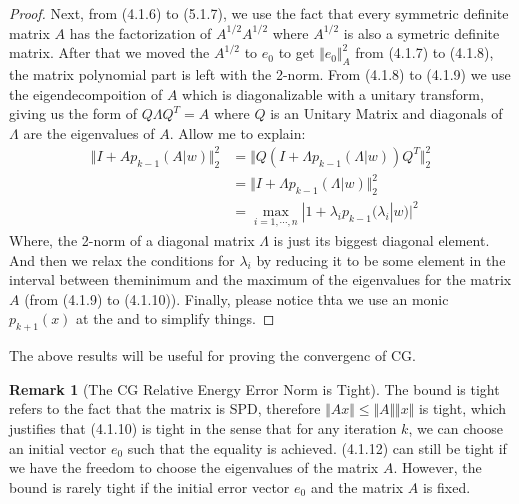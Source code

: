 \documentclass[]{article}
\theoremstyle{definition}
\newtheorem{remark}{Remark}[subsection]
\begin{document}
\begin{proof}
            \par
            Next, from (4.1.6) to (5.1.7), we use the fact that every symmetric definite matrix $A$ has the factorization of $A^{1/2}A^{1/2}$ where $A^{1/2}$ is also a symetric definite matrix. After that we moved the $A^{1/2}$ to $e_0$ to get $\Vert e_0\Vert_A^2$ from (4.1.7) to (4.1.8), the matrix polynomial part is left with the 2-norm. From (4.1.8) to (4.1.9) we use the eigendecompoition of $A$ which is diagonalizable with a unitary transform, giving us the form of $Q\Lambda Q^T = A$ where $Q$ is an Unitary Matrix and diagonals of $\Lambda$ are the eigenvalues of $A$. Allow me to explain: 
            \begin{align}
                \Vert I + Ap_{k - 1}(A|w)\Vert_2^2
                &= \Vert Q(I + \Lambda p_{k - 1}(\Lambda|w))Q^T\Vert_2^2
                \\
                &= \Vert I + \Lambda p_{k - 1}(\Lambda|w)\Vert_2^2
                \\
                &= \max_{i=1,\cdots, n}|1 + \lambda_ip_{k - 1}(\lambda_i|w)|^2
            \end{align}
            Where, the 2-norm of a diagonal matrix $\Lambda$ is just its biggest diagonal element. And then we relax the conditions for $\lambda_i$ by reducing it to be some element in the interval between theminimum and the maximum of the eigenvalues for the matrix $A$ (from (4.1.9) to (4.1.10)). Finally, please notice thta we use an monic $p_{k+1}(x)$ at the and to simplify things. 
        \end{proof}
        The above results will be useful for proving the convergenc of CG. 
        \begin{remark}[The CG Relative Energy Error Norm is Tight]
            The bound is tight refers to the fact that the matrix is SPD, therefore $\Vert Ax\Vert \le \Vert A\Vert\Vert x\Vert$ is tight, which justifies that (4.1.10) is tight in the sense that for any iteration $k$, we can choose an initial vector $e_0$ such that the equality is achieved. (4.1.12) can still be tight if we have the freedom to choose the eigenvalues of the matrix $A$. However, the bound is rarely tight if the initial error vector $e_0$ and the matrix $A$ is fixed. 
        \end{remark}
\end{document}
